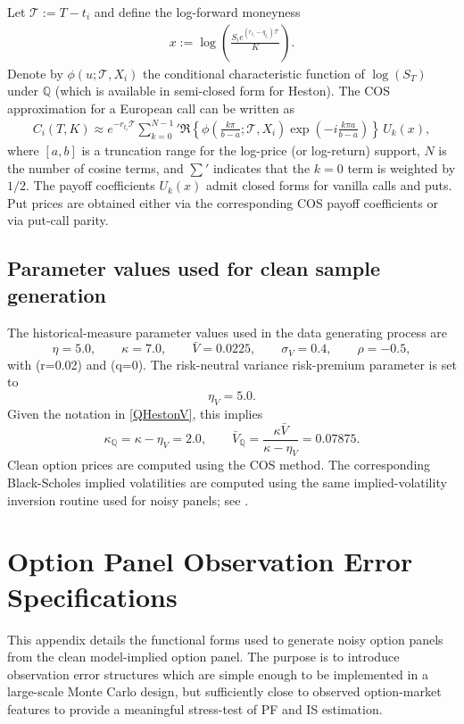 \documentclass[11pt,a4paper,notitlepage]{article}
\numberwithin{equation}{section}
\begin{document}
Let $\mathcal T:=T-t_i$ and define the log-forward moneyness
\begin{align}
x:=\log\!\left(\frac{S_i e^{(r_{t_i}-q_{t_i})\mathcal T}}{K}\right).
\end{align}
Denote by $\phi(u;\mathcal T,X_i)$ the conditional characteristic function of $\log(S_T)$ under $\mathbb{Q}$
(which is available in semi-closed form for Heston). The COS approximation for a European call can be
written as
\begin{align}
C_i(T,K) \approx e^{-r_{t_i}\mathcal T}\sum_{k=0}^{N-1}{}'
\Re\!\left\{\phi\!\left(\frac{k\pi}{b-a};\mathcal T,X_i\right)\exp\!\left(-i\frac{k\pi a}{b-a}\right)\right\}
\,U_k(x),
\label{eq:COS_call}
\end{align}
where $[a,b]$ is a truncation range for the log-price (or log-return) support, $N$ is the number of cosine
terms, and $\sum'$ indicates that the $k=0$ term is weighted by $1/2$. The payoff coefficients $U_k(x)$
admit closed forms for vanilla calls and puts. Put prices are obtained either via the corresponding COS payoff
coefficients or via put-call parity.


\subsection{Parameter values used for clean sample generation}

The historical-measure parameter values used in the data generating process are
\[
\eta=5.0,\qquad
\kappa=7.0,\qquad
\bar V=0.0225,\qquad
\sigma_V=0.4,\qquad
\rho=-0.5,
\]
with (r=0.02) and (q=0). The risk-neutral variance risk-premium parameter is set to
\[
\eta_V=5.0.
\]
Given the notation in \eqref{QHestonV}, this implies
\[
\kappa_{\mathbb Q}=\kappa-\eta_V=2.0,
\qquad
\bar V_{\mathbb Q}=\frac{\kappa\bar V}{\kappa-\eta_V}=0.07875.
\]
Clean option prices are computed using the COS method. The corresponding Black-Scholes implied volatilities are computed using the same implied-volatility inversion routine used for noisy panels; see \citep{jaeckel2015lets}.

\section{Option Panel Observation Error Specifications}
\label{app:option_noise_specs}

This appendix details the functional forms used to generate noisy option panels from the clean model-implied option panel. The purpose is to introduce observation error structures which are simple enough to be implemented in a large-scale Monte Carlo design, but sufficiently close to observed option-market features to provide a meaningful stress-test of PF and IS estimation.
\end{document}
